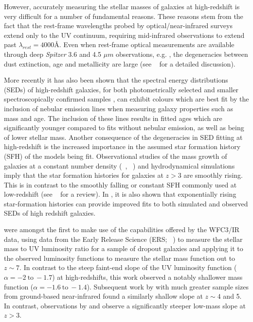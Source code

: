 However, accurately measuring the stellar masses of galaxies at high-redshift is very difficult for a number of fundamental reasons. These reasons stem from the fact that the rest-frame wavelengths probed by optical/near-infrared surveys extend only to the UV continuum, requiring mid-infrared observations to extend past $\lambda_{rest} = 4000$\AA. Even when rest-frame optical measurements are available through deep \emph{Spitzer} 3.6 and 4.5 $\mu m$ observations, e.g.  \citet{2009ApJ...697.1493S,Labbe:2010ho,Gonzalez:2011dn,Yan:2012ky}, the degeneracies between dust extinction, age and metallicity are large (see \citeauthor{Dunlop:2012hs}~\citeyear{Dunlop:2012hs} for a detailed discussion).

More recently it has also been shown that the spectral energy distributions (SEDs) of high-redshift galaxies, for both photometrically selected \citep{2009A&A...502..423S,2010A&A...515A..73S,Ono:2010ed,2011MNRAS.418.2074M,Lorenzoni:2011iz,2012ApJ...755..148G} and smaller spectroscopically confirmed samples \citep{Shim:2011cw,2013MNRAS.429..302C,Stark:2013ix}, can exhibit colours which are best fit by the inclusion of nebular emission lines when measuring galaxy properties such as mass and age. The inclusion of these lines results in fitted ages which are significantly younger compared to fits without nebular emission, as well as being of lower stellar mass. Another consequence of the degeneracies in SED fitting at high-redshift is the increased importance in the assumed star formation history (SFH) of the models being fit. Observational studies of the mass growth of galaxies at a constant number density (\citeauthor{2011MNRAS.412.1123P}~\citeyear{2011MNRAS.412.1123P}, \citeauthor{Salmon:2014tm}~\citeyear{Salmon:2014tm}) and hydrodynamical simulations \citep{2011MNRAS.410.1703F} imply that the star formation histories for galaxies at $z > 3$ are smoothly rising. This is in contrast to the smoothly falling or constant SFH commonly used at low-redshift (see \citeauthor{Conroy:2013dk}~\citeyear{Conroy:2013dk} for a review). In \citet{Maraston:2010dl}, it is also shown that exponentially rising star-formation histories can provide improved fits to both simulated and observed SEDs of high redshift galaxies.

\citet{Gonzalez:2011dn} were amongst the first to make use of the capabilities offered by the WFC3/IR data, using data from the Early Release Science (ERS; \citeauthor{2011ApJS..193...27W}~\citeyear{2011ApJS..193...27W}) to measure the stellar mass to UV luminosity ratio for a sample of dropout galaxies and applying it to the observed luminosity functions to measure the stellar mass function out to $z \sim 7$. In contrast to the steep faint-end slope of the UV luminosity function ($\alpha = -2~\text{to}~-1.7$) at high-redshifts, this work observed a notably shallower mass function ($\alpha = -1.6 ~\text{to}~-1.4$). Subsequent work by \citet{2012ApJ...752...66L} with much greater sample sizes from ground-based near-infrared found a similarly shallow slope at $z \sim 4$ and 5. In contrast, observations by \citet{2011MNRAS.413..162C} and \citet{Santini:2012jq} observe a significantly steeper low-mass slope at $z > 3$.
 
